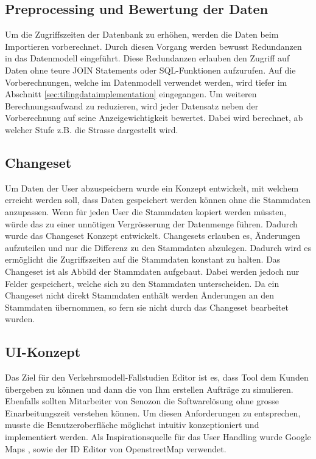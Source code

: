\subsection{Preprocessing und Bewertung der Daten}\label{sec:concept_preprocessing}
Um die Zugriffszeiten der Datenbank zu erhöhen, werden die Daten beim Importieren vorberechnet. Durch diesen Vorgang werden bewusst Redundanzen in das Datenmodell eingeführt. Diese Redundanzen erlauben den Zugriff auf Daten ohne teure JOIN Statements oder SQL-Funktionen aufzurufen. Auf die Vorberechnungen, welche im Datenmodell verwendet werden, wird tiefer im Abschnitt \ref{sec:tilingdataimplementation}  eingegangen. Um weiteren Berechnungsaufwand zu reduzieren, wird jeder Datensatz neben der Vorberechnung auf seine Anzeigewichtigkeit bewertet. Dabei wird berechnet, ab welcher Stufe z.B. die Strasse dargestellt wird.

\subsection{Changeset}
Um Daten der User abzuspeichern wurde ein Konzept entwickelt, mit welchem erreicht werden soll, dass Daten gespeichert werden können ohne die Stammdaten anzupassen. Wenn für jeden User die Stammdaten kopiert werden müssten, würde das zu einer unnötigen Vergrösserung der Datenmenge führen. Dadurch wurde das Changeset Konzept entwickelt. Changesets erlauben es, Änderungen aufzuteilen und nur die Differenz zu den Stammdaten abzulegen. Dadurch wird es ermöglicht die Zugriffszeiten auf die Stammdaten konstant zu halten. Das Changeset ist als Abbild der Stammdaten aufgebaut. Dabei werden jedoch nur Felder gespeichert, welche sich zu den Stammdaten unterscheiden. Da ein Changeset nicht direkt Stammdaten enthält werden Änderungen an den Stammdaten übernommen, so fern sie nicht durch das Changeset bearbeitet wurden.
\subsection{UI-Konzept}
Das Ziel für den Verkehrsmodell-Fallstudien Editor ist es, dass Tool dem Kunden übergeben zu können und dann die von Ihm erstellen Aufträge zu simulieren. Ebenfalls sollten Mitarbeiter von Senozon die Softwarelösung ohne grosse Einarbeitungszeit verstehen können. Um diesen Anforderungen zu entsprechen, musste die Benutzeroberfläche möglichst intuitiv konzeptioniert und implementiert werden. Als Inspirationsquelle für das User Handling wurde Google Maps \cite{GoogleMaps}, sowie der ID Editor \citep{IDEditor} von OpenstreetMap verwendet.
\newpage
